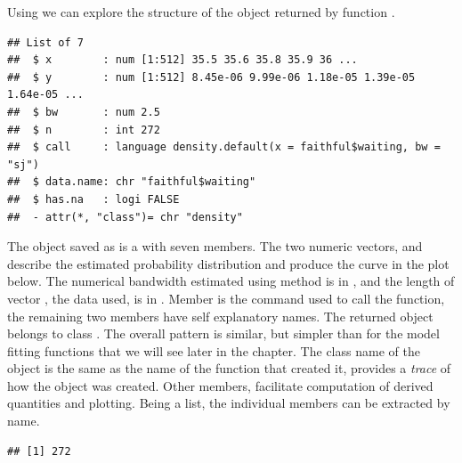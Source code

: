 \documentclass[krantz2]{krantz}\usepackage{knitr}
\begin{document}
\begin{explainbox}
Using  we can explore the structure of the object returned by function .

\begin{knitrout}\footnotesize
{}\color{fgcolor}\begin{kframe}
\begin{alltt}
\end{alltt}
\begin{verbatim}
## List of 7
##  $ x        : num [1:512] 35.5 35.6 35.8 35.9 36 ...
##  $ y        : num [1:512] 8.45e-06 9.99e-06 1.18e-05 1.39e-05 1.64e-05 ...
##  $ bw       : num 2.5
##  $ n        : int 272
##  $ call     : language density.default(x = faithful$waiting, bw = "sj")
##  $ data.name: chr "faithful$waiting"
##  $ has.na   : logi FALSE
##  - attr(*, "class")= chr "density"
\end{verbatim}
\end{kframe}
\end{knitrout}

The object saved as  is a  with seven members. The two numeric vectors,  and  describe the estimated probability distribution and produce the curve in the plot below. The numerical bandwidth estimated using method  is in , and the length of vector , the data used, is in . Member  is the command used to call the function, the remaining two members have self explanatory names. The returned object belongs to class . The overall pattern is similar, but simpler than for the model fitting functions that we will see later in the chapter. The class name of the object is the same as the name of the function that created it,  provides a \emph{trace} of how the object was created. Other members, facilitate computation of derived quantities and plotting. Being a list, the individual members can be extracted by name.

\begin{knitrout}\footnotesize
{}\color{fgcolor}\begin{kframe}
\begin{alltt}
\hlopt{$}
\end{alltt}
\begin{verbatim}
## [1] 272
\end{verbatim}
\end{kframe}
\end{knitrout}
\end{explainbox}
\end{document}

